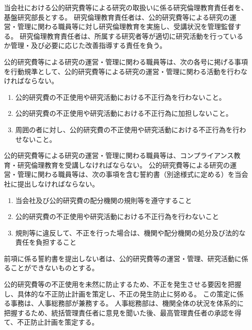 \documentclass[10pt,a4paper,uplatex]{jsarticle}
\begin{document}
当会社における公的研究費等による研究の取扱いに係る研究倫理教育責任者を、基盤研究部長とする。
\term 研究倫理教育責任者は、公的研究費等による研究の運営・管理に関わる職員等に対し研究倫理教育を実施し、受講状況を管理監督する。
\term 研究倫理教育責任者は、所属する研究者等が適切に研究活動を行っているか管理・及び必要に応じた改善指導する責任を負う。

公的研究費等による研究の運営・管理に関わる職員等は、次の各号に掲げる事項を行動規準として、公的研究費等による研究の運営・管理に関わる活動を行わなければならない。
\begin{enumerate}
	\item 公的研究費の不正使用や研究活動における不正行為を行わないこと。
	\item 公的研究費の不正使用や研究活動における不正行為に加担しないこと。
	\item 周囲の者に対し、公的研究費の不正使用や研究活動における不正行為を行わせないこと。
\end{enumerate}
\term 公的研究費等による研究の運営・管理に関わる職員等は、コンプライアンス教育・研究倫理教育を受講しなければならない。
\term 公的研究費等による研究の運営・管理に関わる職員等は、次の事項を含む誓約書（別途様式に定める）を当会社に提出しなければならない。
\begin{enumerate}
	\item 当会社及び公的研究費の配分機関の規則等を遵守すること
	\item 公的研究費の不正使用や研究活動における不正行為を行わないこと
	\item 規則等に違反して、不正を行った場合は、機関や配分機関の処分及び法的な責任を負担すること 
\end{enumerate}
\term 前項に係る誓約書を提出しない者は、公的研究費等の運営・管理、研究活動に係ることができないものとする。

公的研究費等の不正使用を未然に防止するため、不正を発生させる要因を把握し、具体的な不正防止計画を策定し、不正の発生防止に努める。
\term この策定に係る事務は、人事総務部が兼務する。
\term 人事総務部は、機関全体の状況を体系的に把握するため、統括管理責任者に意見を聞いた後、最高管理責任者の承認を得て、不正防止計画を策定する。
\end{document}
